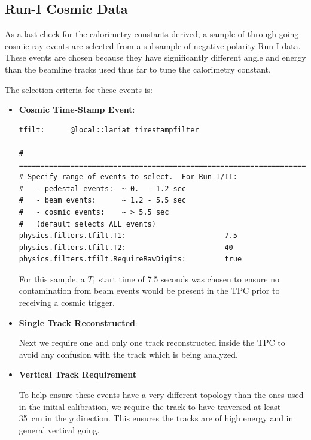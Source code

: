 \subsection{Run-I Cosmic Data}\label{sec:RunICosmics}

As a last check for the calorimetry constants derived, a sample of through going cosmic ray events are selected from a subsample of negative polarity Run-I data. These events are chosen because they have significantly different angle and energy than the beamline tracks used thus far to tune the calorimetry constant.

The selection criteria for these events is: 

\begin{itemize}
\item \textbf{Cosmic Time-Stamp Event}:

\begin{verbatim}
tfilt:      @local::lariat_timestampfilter

# ====================================================================
# Specify range of events to select.  For Run I/II:
#   - pedestal events:  ~ 0.  - 1.2 sec
#   - beam events:      ~ 1.2 - 5.5 sec
#   - cosmic events:    ~ > 5.5 sec
#   (default selects ALL events)
physics.filters.tfilt.T1:                       7.5
physics.filters.tfilt.T2:                       40
physics.filters.tfilt.RequireRawDigits:         true

\end{verbatim}

For this sample, a $T_{1}$ start time of 7.5 seconds was chosen to ensure no contamination from beam events would be present in the TPC prior to receiving a cosmic trigger.


\item \textbf{Single Track Reconstructed}:

Next we require one and only one track reconstructed inside the TPC to avoid any confusion with the track which is being analyzed.

\item \textbf{Vertical Track Requirement}

To help ensure these events have a very different topology than the ones used in the initial calibration, we require the track to have traversed at least 35~cm in the $y$ direction. This ensures the tracks are of high energy and in general vertical going.

\end{itemize}

